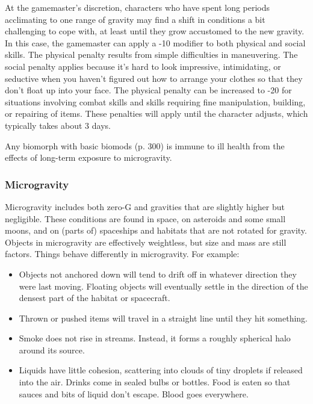 At the gamemaster’s discretion, characters who have spent long periods acclimating to one range of gravity may find a shift in conditions a bit challenging to cope with, at least until they grow accustomed to the new gravity. In this case, the gamemaster can apply a -10 modifier to both physical and social skills. The physical penalty results from simple difficulties in maneuvering. The social penalty applies because it’s hard to look impressive, intimidating, or seductive when you haven’t figured out how to arrange your clothes so that they don’t float up into your face. The physical penalty can be increased to -20 for situations involving combat skills and skills requiring fine manipulation, building, or repairing of items. These penalties will apply until the character adjusts, which typically takes about 3 days.

Any biomorph with basic biomods (p. 300) is immune to ill health from the effects of long-term exposure to microgravity.

\subsubsection{Microgravity}

Microgravity includes both zero-G and gravities that are slightly higher but negligible. These conditions are found in space, on asteroids and some small moons, and on (parts of) spaceships and habitats that are not rotated for gravity. Objects in microgravity are effectively weightless, but size and mass are still factors. Things behave differently in microgravity. For example:

\begin{itemize}
\item Objects not anchored down will tend to drift off in whatever direction they were last moving. Floating objects will eventually settle in the direction of the densest part of the habitat or spacecraft.
\item Thrown or pushed items will travel in a straight line until they hit something.
\item Smoke does not rise in streams. Instead, it forms a roughly spherical halo around its source.
\item Liquids have little cohesion, scattering into clouds of tiny droplets if released into the air. Drinks come in sealed bulbs or bottles. Food is eaten so that sauces and bits of liquid don’t escape. Blood goes everywhere.
\end{itemize}

